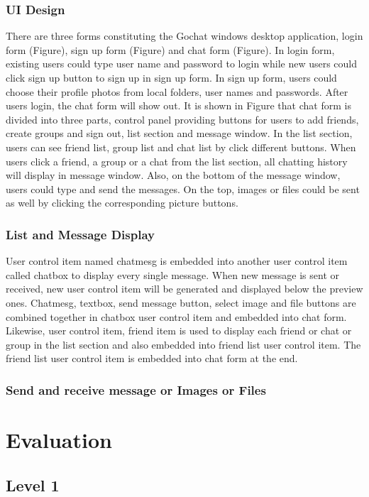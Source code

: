 \documentclass[a4paper,11pt]{article}
\begin{document}
\subsubsection{UI Design}
There are three forms constituting the Gochat windows desktop application, login form (Figure), sign up form (Figure) and chat form (Figure). In login form, existing users could type user name and password to login while new users could click sign up button to sign up in sign up form. In sign up form, users could choose their profile photos from local folders, user names and passwords. 
After users login, the chat form will show out. It is shown in Figure that chat form is divided into three parts, control panel providing buttons for users to add friends, create groups and sign out, list section and message window. In the list section, users can see friend list, group list and chat list by click different buttons. When users click a friend, a group or a chat from the list section, all chatting history will display in message window. Also, on the bottom of the message window, users could type and send the messages. On the top, images or files could be sent as well by clicking the corresponding picture buttons. 
\subsubsection{List and Message Display}
User control item named chatmesg is embedded into another user control item called chatbox to display every single message. When new message is sent or received, new user control item will be generated and displayed below the preview ones. Chatmesg, textbox, send message button, select image and file buttons are combined together in chatbox user control item and embedded into chat form. Likewise, user control item, friend item is used to display each friend or chat or group in the list section and also embedded into friend list user control item. The friend list user control item is embedded into chat form at the end.   
 
\subsubsection{Send and receive message or Images or Files}
\section{Evaluation}
\subsection{Level 1}
 
\end{document}

